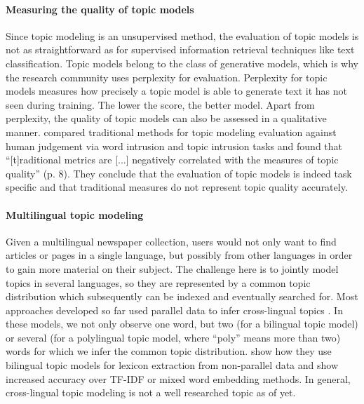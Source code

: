\paragraph{Measuring the quality of topic models}
Since topic modeling is an unsupervised method, the evaluation of topic models is not as straightforward as for supervised information retrieval techniques like text classification. Topic models belong to the class of generative models, which is why the research community uses perplexity for evaluation. Perplexity for topic models measures how precisely a topic model is able to generate text it has not seen during training. The lower the score, the better model. Apart from perplexity, the quality of topic models can also be assessed in a qualitative manner. \citet{NIPS2009_3700} compared traditional methods for topic modeling evaluation against human judgement via word intrusion and topic intrusion tasks and found that ``[t]raditional metrics are [...] negatively correlated with the measures of topic quality'' (p. 8). They conclude that the evaluation of topic models is indeed task specific and that traditional measures do not represent topic quality accurately.

\paragraph{Multilingual topic modeling}
Given a multilingual newspaper collection, users would not only want to find articles or pages in a single language, but possibly from other languages in order to gain more material on their subject. The challenge here is to jointly model topics in several languages, so they are represented by a common topic distribution which subsequently can be indexed and eventually searched for. Most approaches developed so far used parallel data to infer cross-lingual topics \citep{dumaisautomatic1997,mimnopolylingual2009,zhangcrosslingual2010,nicross2011,vulicprobabilistic2015}. In these models,  we not only observe one word, but two (for a bilingual topic model) or several (for a polylingual topic model, where ``poly'' means more than two) words for which we infer the common topic distribution. \citet{Ma16b} show how they use bilingual topic models for lexicon extraction from non-parallel data and show increased accuracy over TF-IDF or mixed word embedding methods. In general, cross-lingual topic modeling is not a well researched topic as of yet.

